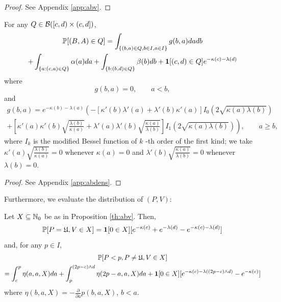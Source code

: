 \documentclass{aptpub}
\begin{document}
\begin{proof}
See Appendix \ref{app:abv}.
\end{proof}

\begin{corollary}\label{cor:abdens} For any $Q\in\mathcal{B}([c,d)\times(c,d])$,
\begin{multline*}
\mathbb{P}[(B,A)\in Q]=\int_{\{(b,a)\in Q, b \in I, a \in I\}}g(b,a)dadb\\
+\int_{\{a:(c,a) \in Q \}}\alpha(a)da
+\int_{\{b:(b,d) \in Q \}}\beta(b)db+\mathbf{1}[(c,d)\in Q]e^{-\kappa(c)-\lambda(d)}
\end{multline*}
where 
$$g(b,a)=0,\qquad a<b, $$
and
\begin{multline}
g(b,a)
= e^{-\kappa(b)-\lambda(a)}
\left(
-\left[\kappa'(b)\lambda'(a)+\lambda'(b)\kappa'(a)\right] I_0(2\sqrt{\kappa(a)\lambda(b)})
\right.
\\
\left.
+\left[\kappa'(a)\kappa'(b)
\sqrt{\frac{\lambda(b)}{\kappa(a)}}
+\lambda'(a)\lambda'(b)
\sqrt{\frac{\kappa(a)}{\lambda(b)}}\right] I_1(2\sqrt{\kappa(a)\lambda(b)})
\right), \qquad a \geq b,
\label{eq:gamma}
\end{multline}
where $I_k$ is the modified Bessel function of $k$ -th order of the first kind; we take $\kappa'(a)\sqrt{\frac{\lambda(b)}{\kappa(a)}}=0$ whenever $\kappa(a)=0$ and 
$\lambda'(b)
\sqrt{\frac{\kappa(a)}{\lambda(b)}}=0$ whenever $\lambda(b)=0$.
\end{corollary}



\begin{proof} See Appendix \ref{app:abdens}.
\end{proof}

Furthermore, we evaluate the distribution of $(P,V)$:

\begin{proposition}
Let $X \subseteq \mathbb{N}_0$ be as in Proposition \ref{th:abv}. Then, 
\begin{equation}
\mathbb{P}[P=\mathfrak{U}, V\in X]=\mathbf{1}[0\in X] [e^{-\kappa(c)}+e^{-\lambda(d)}-e^{-\kappa(c)-\lambda(d)}]\label{eq:pd0}
\end{equation}
and, for any $p\in I$,
\begin{multline}
\mathbb{P}[P<p,P\neq\mathfrak{U},V\in X]\\=
\int_{c}^{p}\eta(a,a,X)da+\int_{p}^{(2p-c) \wedge d}\eta(2p-a,a,X)da+\mathbf{1}[0 \in X] [e^{-\kappa(c)-\lambda((2p-c) \wedge d)}-e^{-\kappa(c)}]
\label{eq:pdist}
\end{multline}
where $\eta(b,a,X)=-\frac{\partial}{\partial a} p(b,a,X)$, $b<a$. 
\end{proposition}
\end{document}
